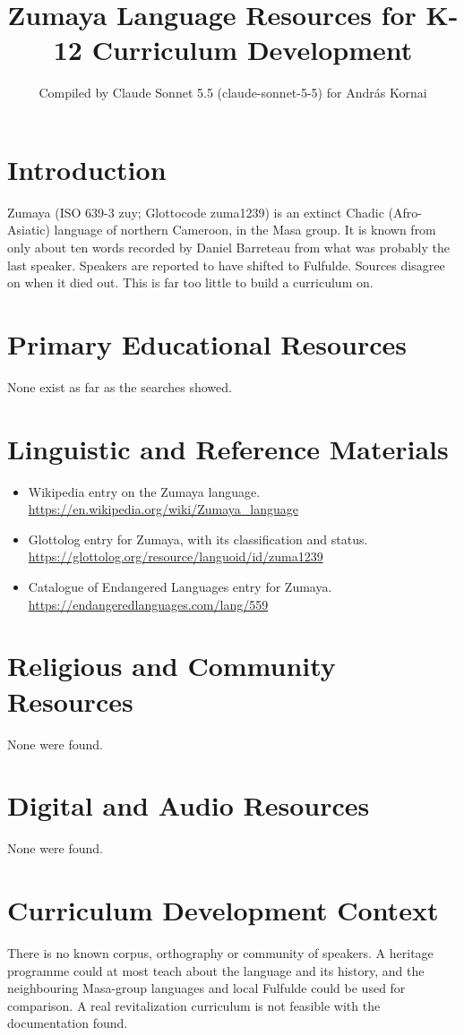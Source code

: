 \documentclass[12pt]{article}
\title{Zumaya Language Resources for K-12 Curriculum Development}
\author{Compiled by Claude Sonnet 5.5 (claude-sonnet-5-5) for Andr\'as Kornai}
\date{}
\begin{document}
\maketitle

\section{Introduction}
Zumaya (ISO 639-3 zuy; Glottocode zuma1239) is an extinct Chadic (Afro-Asiatic) language of northern Cameroon, in the Masa group. It is known from only about ten words recorded by Daniel Barreteau from what was probably the last speaker. Speakers are reported to have shifted to Fulfulde. Sources disagree on when it died out. This is far too little to build a curriculum on.

\section{Primary Educational Resources}
None exist as far as the searches showed.

\section{Linguistic and Reference Materials}
\begin{itemize}
\item Wikipedia entry on the Zumaya language. \url{https://en.wikipedia.org/wiki/Zumaya_language}
\item Glottolog entry for Zumaya, with its classification and status. \url{https://glottolog.org/resource/languoid/id/zuma1239}
\item Catalogue of Endangered Languages entry for Zumaya. \url{https://endangeredlanguages.com/lang/559}
\end{itemize}

\section{Religious and Community Resources}
None were found.

\section{Digital and Audio Resources}
None were found.

\section{Curriculum Development Context}
There is no known corpus, orthography or community of speakers. A heritage programme could at most teach about the language and its history, and the neighbouring Masa-group languages and local Fulfulde could be used for comparison. A real revitalization curriculum is not feasible with the documentation found.
\end{document}
